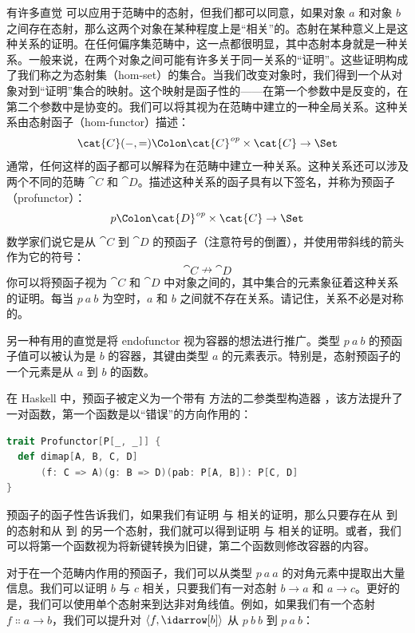 
\lettrine[lhang=0.17]{有}{许多直觉} 可以应用于范畴中的态射，但我们都可以同意，如果对象 $a$ 和对象 $b$ 之间存在态射，那么这两个对象在某种程度上是“相关”的。态射在某种意义上是这种关系的证明。在任何偏序集范畴中，这一点都很明显，其中态射本身就是一种关系。一般来说，在两个对象之间可能有许多关于同一关系的“证明”。这些证明构成了我们称之为态射集（hom-set）的集合。当我们改变对象时，我们得到一个从对象对到“证明”集合的映射。这个映射是函子性的——在第一个参数中是反变的，在第二个参数中是协变的。我们可以将其视为在范畴中建立的一种全局关系。这种关系由态射函子（hom-functor）描述：
\[\cat{C}(-, =) \Colon \cat{C}^\mathit{op}\times{}\cat{C} \to \Set\]
通常，任何这样的函子都可以解释为在范畴中建立一种关系。这种关系还可以涉及两个不同的范畴 $\cat{C}$ 和 $\cat{D}$。描述这种关系的函子具有以下签名，并称为预函子（profunctor）：
\[p \Colon \cat{D}^\mathit{op}\times{}\cat{C} \to \Set\]
数学家们说它是从 $\cat{C}$ 到 $\cat{D}$ 的预函子（注意符号的倒置），并使用带斜线的箭头作为它的符号：
\[\cat{C} \nrightarrow \cat{D}\]
你可以将预函子视为 $\cat{C}$ 和 $\cat{D}$ 中对象之间的，其中集合的元素象征着这种关系的证明。每当 $p\ a\ b$ 为空时，$a$ 和 $b$ 之间就不存在关系。请记住，关系不必是对称的。

另一种有用的直觉是将 endofunctor 视为容器的想法进行推广。类型 $p\ a\ b$ 的预函子值可以被认为是 $b$ 的容器，其键由类型 $a$ 的元素表示。特别是，态射预函子的一个元素是从 $a$ 到 $b$ 的函数。

在 Haskell 中，预函子被定义为一个带有  方法的二参类型构造器 ，该方法提升了一对函数，第一个函数是以“错误”的方向作用的：

\begin{lstlisting}[language=Scala]
trait Profunctor[P[_, _]] {
  def dimap[A, B, C, D]
      (f: C => A)(g: B => D)(pab: P[A, B]): P[C, D]
}
\end{lstlisting}
预函子的函子性告诉我们，如果我们有证明  与  相关的证明，那么只要存在从  到  的态射和从  到  的另一个态射，我们就可以得到证明  与  相关的证明。或者，我们可以将第一个函数视为将新键转换为旧键，第二个函数则修改容器的内容。

对于在一个范畴内作用的预函子，我们可以从类型 $p\ a\ a$ 的对角元素中提取出大量信息。我们可以证明 $b$ 与 $c$ 相关，只要我们有一对态射 $b \to a$ 和 $a \to c$。更好的是，我们可以使用单个态射来到达非对角线值。例如，如果我们有一个态射 $f \Colon a \to b$，我们可以提升对 $\langle f, \idarrow[b] \rangle$ 从 $p\ b\ b$ 到 $p\ a\ b$：

